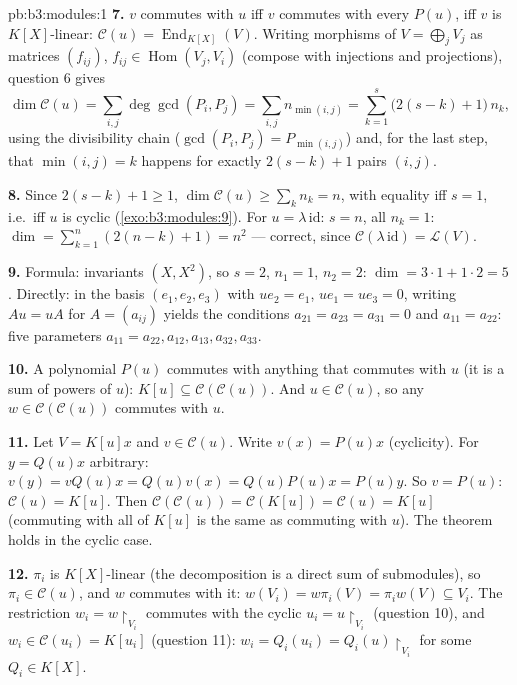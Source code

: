 \begin{solution}{pb:b3:modules:1}
\textbf{7.} $v$ commutes with $u$ iff $v$ commutes with every
$P(u)$, iff $v$ is $K[X]$-linear: $\mathcal C(u) =
\operatorname{End}_{K[X]}(V)$. Writing morphisms of $V =
\bigoplus_j V_j$ as matrices $(f_{ij})$, $f_{ij} \in
\operatorname{Hom}(V_j, V_i)$ (compose with injections and
projections), question 6 gives
\[
\dim \mathcal C(u) = \sum_{i,j} \deg\gcd(P_i, P_j)
= \sum_{i,j} n_{\min(i,j)}
= \sum_{k=1}^{s} \bigl(2(s - k) + 1\bigr)\,n_k ,
\]
using the divisibility chain ($\gcd(P_i, P_j) =
P_{\min(i,j)}$) and, for the last step, that $\min(i,j) = k$
happens for exactly $2(s - k) + 1$ pairs $(i, j)$.

\textbf{8.} Since $2(s-k)+1 \geq 1$, $\dim\mathcal C(u) \geq
\sum_k n_k = n$, with equality iff $s = 1$, i.e.\ iff $u$ is
cyclic (\cref{exo:b3:modules:9}). For $u = \lambda\,\mathrm{id}$:
$s = n$, all $n_k = 1$: $\dim = \sum_{k=1}^n (2(n-k)+1) = n^2$
--- correct, since $\mathcal C(\lambda\,\mathrm{id}) = \mathcal
L(V)$.

\textbf{9.} Formula: invariants $(X, X^2)$, so $s = 2$, $n_1 =
1$, $n_2 = 2$: $\dim = 3\cdot1 + 1\cdot2 = 5$. Directly: in the
basis $(e_1, e_2, e_3)$ with $u e_2 = e_1$, $ue_1 = ue_3 = 0$,
writing $Au = uA$ for $A = (a_{ij})$ yields the conditions
$a_{21} = a_{23} = a_{31} = 0$ and $a_{11} = a_{22}$: five 
parameters $a_{11}{=}a_{22}, a_{12}, a_{13}, a_{32}, a_{33}$.

\textbf{10.} A polynomial $P(u)$ commutes with anything that
commutes with $u$ (it is a sum of powers of $u$): $K[u]
\subseteq \mathcal C(\mathcal C(u))$. And $u \in \mathcal C(u)$,
so any $w \in \mathcal C(\mathcal C(u))$ commutes with $u$.

\textbf{11.} Let $V = K[u]x$ and $v \in \mathcal C(u)$. Write
$v(x) = P(u)x$ (cyclicity). For $y = Q(u)x$ arbitrary: $v(y) =
vQ(u)x = Q(u)v(x) = Q(u)P(u)x = P(u)y$. So $v = P(u)$: $\mathcal
C(u) = K[u]$. Then $\mathcal C(\mathcal C(u)) = \mathcal
C(K[u]) = \mathcal C(u) = K[u]$ (commuting with all of $K[u]$ is
the same as commuting with $u$). The theorem holds in the cyclic
case.

\textbf{12.} $\pi_i$ is $K[X]$-linear (the decomposition is a
direct sum of submodules), so $\pi_i \in \mathcal C(u)$, and $w$
commutes with it: $w(V_i) = w\pi_i(V) = \pi_i w(V) \subseteq
V_i$. The restriction $w_i = w\restriction_{V_i}$ commutes with
the cyclic $u_i = u\restriction_{V_i}$ (question 10), and $w_i
\in \mathcal C(u_i) = K[u_i]$ (question 11): $w_i = Q_i(u_i) =
Q_i(u)\restriction_{V_i}$ for some $Q_i \in K[X]$.


\end{solution}

